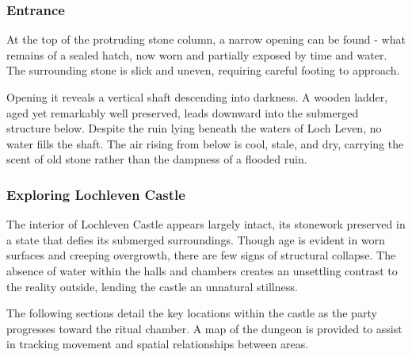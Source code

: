 \subsubsection*{ Entrance}
{\entryfont At the top of the protruding stone column, a narrow opening can be found - what remains of a sealed hatch, now worn and partially exposed by time and water. The surrounding stone is slick and uneven, requiring careful footing to approach.

Opening it reveals a vertical shaft descending into darkness. A wooden ladder, aged yet remarkably well preserved, leads downward into the submerged structure below. Despite the ruin lying beneath the waters of Loch Leven, no water fills the shaft. The air rising from below is cool, stale, and dry, carrying the scent of old stone rather than the dampness of a flooded ruin.}
\subsubsection*{Exploring Lochleven Castle}
{\entryfont The interior of Lochleven Castle appears largely intact, its stonework preserved in a state that defies its submerged surroundings. Though age is evident in worn surfaces and creeping overgrowth, there are few signs of structural collapse. The absence of water within the halls and chambers creates an unsettling contrast to the reality outside, lending the castle an unnatural stillness.

The following sections detail the key locations within the castle as the party progresses toward the ritual chamber. A map of the dungeon is provided to assist in tracking movement and spatial relationships between areas.}
